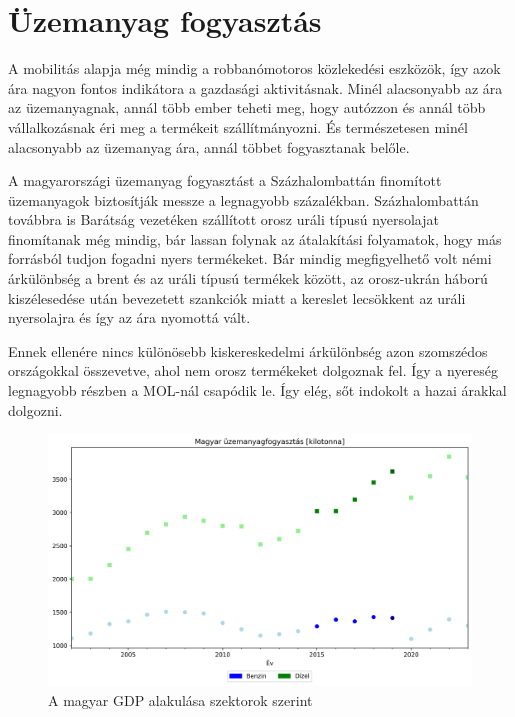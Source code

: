 \section{Üzemanyag fogyasztás}

A mobilitás alapja még mindig a robbanómotoros közlekedési eszközök, így azok ára nagyon fontos
indikátora a gazdasági aktivitásnak. Minél alacsonyabb az ára az üzemanyagnak, annál több ember
teheti meg, hogy autózzon és annál több vállalkozásnak éri meg a termékeit szállítmányozni. És
természetesen minél alacsonyabb az üzemanyag ára, annál többet fogyasztanak belőle.

A magyarországi üzemanyag fogyasztást a Százhalombattán finomított üzemanyagok biztosítják messze a
legnagyobb százalékban. Százhalombattán továbbra is Barátság vezetéken szállított orosz uráli
típusú nyersolajat finomítanak még mindig, bár lassan folynak az átalakítási folyamatok, hogy más
forrásból tudjon fogadni nyers termékeket. Bár mindig megfigyelhető volt némi árkülönbség a brent
és az uráli típusú termékek között, az orosz-ukrán háború kiszélesedése után bevezetett szankciók
miatt a kereslet lecsökkent az uráli nyersolajra és így az ára nyomottá vált.

Ennek ellenére nincs különösebb kiskereskedelmi árkülönbség azon szomszédos országokkal összevetve,
ahol nem orosz termékeket dolgoznak fel. Így a nyereség legnagyobb részben a MOL-nál csapódik le.
Így elég, sőt indokolt a hazai árakkal dolgozni.

\begin{figure}[htbp]
    \centering
    \includegraphics[width=1\textwidth, height=0.8\textheight, keepaspectratio]{../abrak/petrol_consumption.png}
    \caption{A magyar GDP alakulása szektorok szerint}\label{fig:petrol_consumption}
\end{figure}

